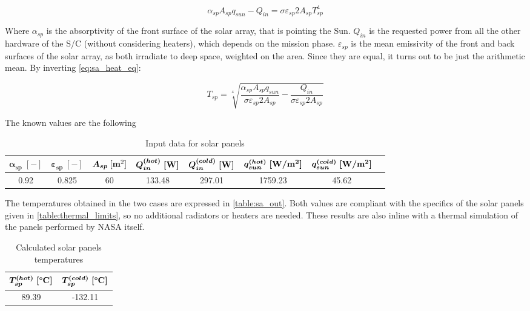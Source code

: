 \begin{equation}
    \alpha_{sp}A_{sp} q_{sun} - Q_{in} = \sigma \varepsilon_{sp} 2 A_{sp} T_{sp}^4
    \label{eq:sa_heat_eq}
\end{equation}

Where $\alpha_{sp}$ is the absorptivity of the front surface of the solar array, that is pointing the Sun. $Q_{in}$ is the requested power from all the other hardware of the S/C (without considering heaters), which depends on the mission phase. $\varepsilon_{sp}$ is the mean emissivity of the front and back surfaces of the solar array, as both irradiate to deep space, weighted on the area. Since they are equal, it turns out to be just the arithmetic mean. 
By inverting \autoref{eq:sa_heat_eq}:

\begin{equation}
    T_{sp} = \sqrt [4] {\frac{\alpha_{sp}A_{sp} q_{sun}}{\sigma  \varepsilon_{sp}2 A_{sp}} - \frac{Q_{in}}{\sigma \varepsilon_{sp}2 A_{sp}}}
\end{equation}

The known values are the following

\begin{table}[H]
    \renewcommand{\arraystretch}{1.5}
    \centering
    \begin{tabular}{|c|c|c|c|c|c|c|c|}
        \hline
        $\boldsymbol{\alpha_{sp} \; [-]}$ & $\boldsymbol{\varepsilon_{sp} \; [-]}$ & $\boldsymbol{A_{sp}}\;[\textrm{\textbf{m}}^2]$ & $\boldsymbol{Q_{in}^{(hot)} \; [\textrm{\textbf{W}}]}$ & $\boldsymbol{Q_{in}^{(cold)} \; [\textrm{\textbf{W}}]}$ & $\boldsymbol{q_{sun}^{(hot)} \; [\textrm{\textbf{W}}/\textrm{\textbf{m}}^2]}$ & $\boldsymbol{q_{sun}^{(cold)} \; [\textrm{\textbf{W}}/\textrm{\textbf{m}}^2]}$ \\
        \hline
        \hline
        0.92 & 0.825 & 60 &  133.48 & 297.01 & 1759.23 & 45.62 \\
        \hline
    \end{tabular}
    \caption{Input data for solar panels}
    \label{table:sa_data}
\end{table}

\vspace*{-3mm}

The temperatures obtained in the two cases are expressed in \autoref{table:sa_out}. 
Both values are compliant with the specifics of the solar panels given in \autoref{table:thermal_limits}, so no additional radiators or heaters are needed. These results are also inline with a thermal simulation of the panels performed by NASA itself. \cite{solar_panels_coef}

\begin{table}[H]
    \renewcommand{\arraystretch}{1.5}
    \centering
    \begin{tabular}{|c|c|}
        \hline
        $\boldsymbol{T_{sp}^{(hot)} \; [\textrm{\textbf{°C}}]}$ & $\boldsymbol{T_{sp}^{(cold)} \; [\textrm{\textbf{°C}}]}$ \\
        \hline
        \hline
        89.39 & -132.11 \\
        \hline
    \end{tabular}
    \caption{Calculated solar panels temperatures}
    \label{table:sa_out}
\end{table}

